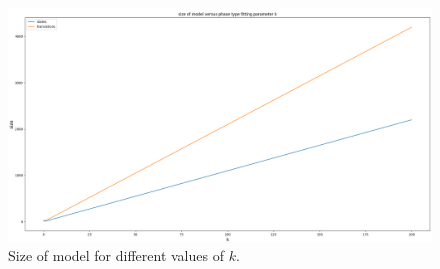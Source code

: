 \documentclass[paper=a4, fontsize=11pt]{scrartcl}
\numberwithin{equation}{section}		%
\numberwithin{figure}{section}			%
\numberwithin{table}{section}				%
\begin{document}
	\begin{figure}
		\centering
		\includegraphics[width=16cm]{size.png}
		\caption{Size of model for different values of $k$.}
		\label{fig:time1}
	\end{figure}
	


\end{document}
